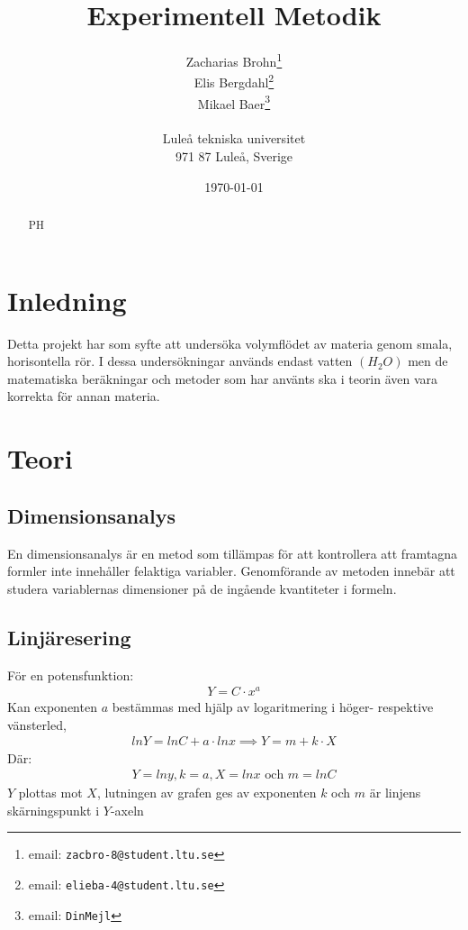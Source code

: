 \documentclass[a4paper,12pt]{article}
\begin{document}
%
\title{Experimentell Metodik}
%
\author{Zacharias Brohn\thanks{email: \texttt{zacbro-8@student.ltu.se}}\\  
        Elis Bergdahl\thanks{email: \texttt{elieba-4@student.ltu.se}} \\
        Mikael Baer\thanks{email: \texttt{DinMejl}} \\
        \\
        Luleå tekniska universitet \\ 
        971 87 Luleå, Sverige}
%
\date{\today}
%
\maketitle
%
\begin{abstract}
    PH
\end{abstract}
%
\section{Inledning}
    Detta projekt har som syfte att undersöka volymflödet av materia genom smala, horisontella rör. I dessa undersökningar används endast vatten $(H_2O)$ men de matematiska beräkningar och metoder som har använts ska i teorin även vara korrekta för annan materia.
%
\section{Teori}
%
\subsection{Dimensionsanalys}
    En dimensionsanalys är en metod som tillämpas för att kontrollera att framtagna formler inte innehåller felaktiga variabler. Genomförande av metoden innebär att studera variablernas dimensioner på de ingående kvantiteter i formeln.
%
\subsection{Linjäresering}
    För en potensfunktion:
        \begin{align}
            Y = C \cdot x^a
        \end{align}
    Kan exponenten $a$ bestämmas med hjälp av logaritmering i höger- respektive vänsterled,
        \begin{align}
            ln Y = ln C + a \cdot ln x \implies Y = m + k \cdot X
        \end{align}
    Där:
        \begin{align}
            Y = ln y, k = a, X = ln x \text{ och } m = ln C
        \end{align}
    $Y$ plottas mot $X$, lutningen av grafen ges av exponenten $k$ och $m$ är linjens skärningspunkt i $Y$-axeln
%
\end{document}
